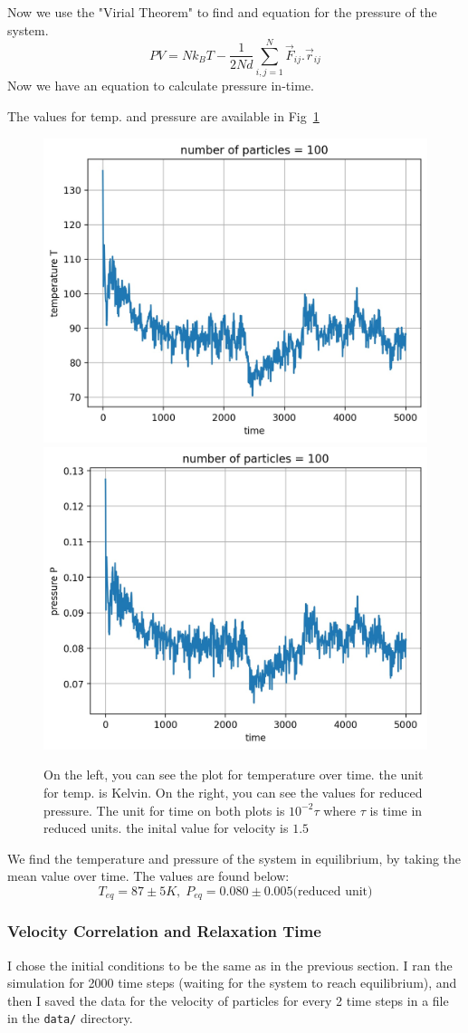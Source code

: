 \documentclass[12pt, a4paper]{article}
\begin{document}
	Now we use the "Virial Theorem" to find and equation for the pressure of the system.
	\begin{equation}
		P V = N k_B T - \frac{1}{2 N d} \sum_{i,j = 1}^{N} \vec{F}_{ij}.\vec{r}_{ij}
	\end{equation}
	 Now we have an equation to calculate pressure in-time. 
	 
	 The values for temp. and pressure are available in Fig~\ref{fig:temp_pressure}
	 
	 \begin{figure}[h!]
		\centering
		\includegraphics[width=.45\linewidth]{../results/temp100_5000.jpg}
		\includegraphics[width=.45\linewidth]{../results/pressure100_5000.jpg}
		\caption{On the left, you can see the plot for temperature over time. the unit for temp. is Kelvin. On the right, you can see the values for 
		reduced pressure. The unit for time on both plots is $10^{-2} \tau$ where $\tau$ is time in reduced units.
		the inital value for velocity is $1.5$}
		\label{fig:temp_pressure}
	 \end{figure}
 
 	We find the temperature and pressure of the system in equilibrium, by taking the mean value over time. The values are found below:
 	\begin{equation*}
 		T_{eq} = 87 \pm 5 K, \; P_{eq} = 0.080 \pm 0.005 \text{(reduced unit)}
 	\end{equation*}
	
	\subsubsection{Velocity Correlation and Relaxation Time}
	I chose the initial conditions to be the same as in the previous section.
	I ran the simulation for 2000 time steps (waiting for the system to reach equilibrium), and then I saved the
	data for the velocity of particles for every 2 time steps in a file in the \texttt{data/} directory.
	
\end{document}

